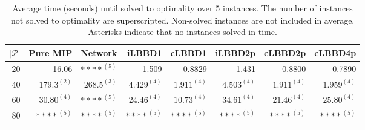 \begin{table*}
    \centering
    \caption{Average time (seconds) until solved to optimality over 5 instances. The number of instances not solved to optimality are superscripted. Non-solved instances are not included in average. Asterisks indicate that no instances solved in time.}\label{tab:avgTimeOpt}
    \begin{tabular}{rrrrrrrr} \toprule
        $|\mathcal{P}|$ & Pure MIP & Network & iLBBD1 & cLBBD1 & iLBBD2p & cLBBD2p & cLBBD4p \\ \midrule
        20              & 16.06 &     ${****}^{(5)}$    & 1.509 &  0.8829 & 1.431 & 0.8800 & 0.7890 \\
        40              & $179.3^{(2)}$ & $268.5^{(3)}$   &  $4.429^{(4)}$ & $1.911^{(4)}$ & $4.503^{(4)}$ & $1.911^{(4)}$ & $1.959^{(4)}$ \\
        60 & $30.80^{(4)}$ & ${****}^{(5)}$ & $24.46^{(4)}$ & $10.73^{(4)}$ & $34.61^{(4)}$ & $21.46^{(4)}$ & $25.80^{(4)}$ \\
        80 & ${****}^{(5)}$ & ${****}^{(5)}$ & ${****}^{(5)}$ & ${****}^{(5)}$ & ${****}^{(5)}$ & ${****}^{(5)}$ & ${****}^{(5)}$ \\
        \bottomrule
    \end{tabular}
\end{table*}
